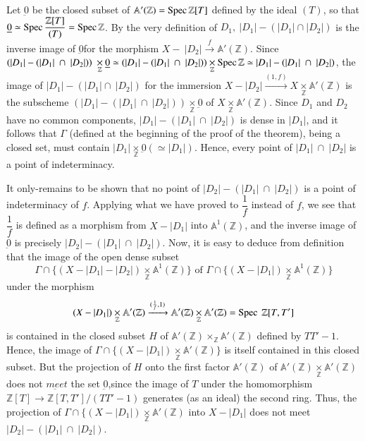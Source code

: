Let $\underbar{0}$ be the closed subset of $\mathbb{A'}(\mathbb{Z}) =
\operatorname{Spec} \mathbb{Z}[T]$ defined by the ideal $(T)$, so that $\underbar{0}
\simeq \operatorname{Spec} \dfrac{\mathbb{Z}[T]}{(T)} = \operatorname{Spec} \mathbb{Z}$. By the
very definition of $D_{1}, ~|D_{1}| - (|D_{1}| \cap |D_{2}|)$ is the
inverse image of $\underbar{0}$\pageoriginale for the morphism $X- ~|D_{2}|
\xrightarrow{f} \mathbb{A'}(\mathbb{Z})$. Since $(|D_{1}| - (|D_{1}|
~\cap ~ |D_{2}|))~ \underset{\mathbb{Z}}{\times} \underbar{0} \simeq
(|D_{1}| -(|D_{1}| ~\cap ~ |D_{2}|)) \underset{\mathbb{Z}}{\times}
\operatorname{Spec} \mathbb{Z} \simeq |D_{1}| - (|D_{1}|~ \cap~ |D_{2}|)$, the image
of $|D_{1}| - (|D_{1}| \cap ~ |D_{2}|)$ for the immersion $X - |D_{2}|
\xrightarrow{(1, f)}X  \underset{\mathbb{Z}}{\times} \mathbb{A'}
(\mathbb{Z})$ is the subscheme $(|D_{1}| - (|D_{1}| ~\cap ~ |D_{2}|))
\underset{\mathbb{Z}}{\times} \underbar{0}$ of $ X
\underset{\mathbb{Z}}{\times} \mathbb{A'}(\mathbb{Z})$. Since $D_{1}$
and $D_{2}$ have no common components, $|D_{1}| - (|D_{1}| ~\cap ~
|D_{2}|)$ is dense in $|D_{1}|$, and it follows that $\Gamma$
(defined at the beginning of the proof of the theorem), being a closed
set, must contain $|D_{1}| \underset{\mathbb{Z}}{\times} \underbar{0}
(\simeq |D_{1}|)$. Hence, every point of $|D_{1}| ~\cap ~ |D_{2}|$ is
a point of indeterminacy.  

It only-remains to be shown that no point of $|D_{2}|-(|D_{1}| ~\cap ~
|D_{2}|)$ is a point of indeterminacy of $f$. Applying what we have
proved to $\dfrac{1}{f}$ instead of $f$, we see that $\dfrac{1}{f}$ is
defined as a morphism from $X - |D_{1}|$ into $\mathbb{A}^{1}
(\mathbb{Z})$, and the inverse image of $\underbar{0}$ is precisely
$|D_{2}|-(|D_{1}| ~\cap ~ |D_{2}|)$. Now, it is easy to deduce from
definition that the image of the open dense subset  
$$ 
\Gamma \cap \{ (X - |D_{1}| - |D_{2}|) \underset{\mathbb{Z}}{\times}
\mathbb{A}^1 (\mathbb{Z})\} \text{  of } \Gamma \cap \{(X - |D_{1}|) 
\underset{\mathbb{Z}}{\times} \mathbb{A}^1 (\mathbb{Z}) \} 
$$
under the morphism
$$
(X - |D_{1}|) \underset{\mathbb{Z}}{\times} \mathbb{A'}
(\mathbb{Z})\xrightarrow{(\frac{1}{f}, 1)} \mathbb{A'}(\mathbb{Z})
\underset{\mathbb{Z}}{\times} \mathbb{A'}(\mathbb{Z}) = \operatorname{Spec} ~
\mathbb{Z}[T,T'] 
$$
is contained in the closed subset $H$ of $\mathbb{A'}(\mathbb{Z})
\times_{\mathbb{Z}} \mathbb{A'}(\mathbb{Z})$ defined by $TT'
-1$. Hence, the image of $\Gamma \cap \{(X - |D_{1}|)
\underset{\mathbb{Z}}{\times} \mathbb{A'} (\mathbb{Z})\}$ is itself
contained in this closed subset. But the projection of $H$ onto the
first factor $\mathbb{A'} (\mathbb{Z})$ of $\mathbb{A'} (\mathbb{Z})
\underset{\mathbb{Z}}{\times} \mathbb{A'} (\mathbb{Z})$ does not
$\underbar{meet}$ the set $\underbar{0}$,\pageoriginale since the
image of $T$ under 
the homomorphism $\mathbb{Z}[T] \to \mathbb{Z}[T,T']/(TT' - 1)$
generates (as an ideal) the second ring. Thus, the projection of
$\Gamma \cap \{(X - |D_{1}|) \underset{\mathbb{Z}}{\times} \mathbb{A'}
(\mathbb{Z})$ into $X - |D_{1}|$ does not meet $|D_{2}| - (|D_{1}|
~\cap~ |D_{2}|)$.  

